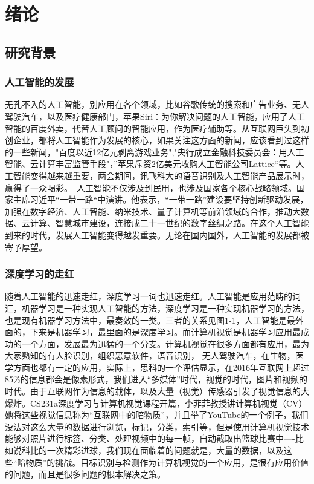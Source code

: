 \chapter{绪论}
	\section{研究背景}

	\subsection{人工智能的发展}
无孔不入的人工智能，别应用在各个领域，比如谷歌传统的搜索和广告业务、无人驾驶汽车，以及医疗健康部门，苹果Siri：为你解决问题的人工智能，应用了人工智能的百度外卖，代替人工顾问的智能应用，作为医疗辅助等。从互联网巨头到初创企业，都将人工智能作为发展的核心，如果关注这方面的新闻，应该看到过这样的一些新闻，"百度以近12亿元剥离游戏业务","央行成立金融科技委员会：用人工智能、云计算丰富监管手段"，”苹果斥资2亿美元收购人工智能公司Lattice“等。人工智能变得越来越重要，两会期间，讯飞科大的语音识别及人工智能产品展示时，赢得了一众喝彩。　人工智能不仅涉及到民用，也涉及国家各个核心战略领域。国家主席习近平“一带一路“中演讲。他表示，“一带一路”建设要坚持创新驱动发展，加强在数字经济、人工智能、纳米技术、量子计算机等前沿领域的合作，推动大数据、云计算、智慧城市建设，连接成二十一世纪的数字丝绸之路。在这个人工智能到来的时代，发展人工智能变得越发重要。无论在国内国外，人工智能的发展都被寄予厚望。
	

		\subsection{深度学习的走红}
	随着人工智能的迅速走红，深度学习一词也迅速走红。人工智能是应用范畴的词汇，机器学习是一种实现人工智能的方法，深度学习是一种实现机器学习的方法，也是现有机器学习方法中，最奏效的一类。三者的关系见图1-1，人工智能是最外面的，下来是机器学习，最里面的是深度学习。而计算机视觉是机器学习应用最成功的一个方面，发展最为迅猛的一个分支。计算机视觉在很多方面都有应用，最为大家熟知的有人脸识别，组织恶意软件，语音识别，	无人驾驶汽车，在生物，医学方面也都有一定的应用，实际上，思科的一个评估显示，在2016年互联网上超过85\%的信息都会是像素形式，我们进入“多媒体”时代，视觉的时代，图片和视频的时代。由于互联网作为信息的载体，以及大量（视觉）传感器引发了视觉信息的大爆炸。CS231a深度学习与计算机视觉课程开篇，李菲菲教授讲计算机视觉（CV）她将这些视觉信息称为“互联网中的暗物质”，并且举了YouTube的一个例子，我们没法对这么大量的数据进行浏览，标记，分类，索引等，但是使用计算机视觉技术能够对照片进行标签、分类、处理视频中的每一帧，自动截取出篮球比赛中----比如说科比的一次精彩进球，我们现在面临着的问题就是，大量的数据，以及这些“暗物质”的挑战。目标识别与检测作为计算机视觉的一个应用，是很有应用价值的问题，而且是很多问题的根本解决之策。
	
